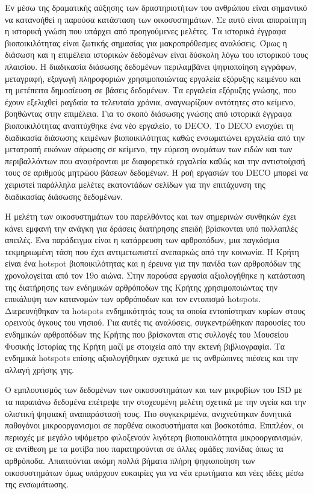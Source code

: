\documentclass[11pt]{article}
\begin{document}
Εν μέσω της δραματικής αύξησης των δραστηριοτήτων του ανθρώπου είναι σημαντικό
να κατανοήθεί η παρούσα κατάσταση των οικοσυστημάτων. Σε αυτό είναι
απαραίτητη η ιστορική γνώση που υπάρχει από προηγούμενες μελέτες.
Τα ιστορικά έγγραφα βιοποικιλότητας είναι ζωτικής σημασίας για
μακροπρόθεσμες αναλύσεις. Όμως η διάσωση και η επιμέλεια ιστορικών δεδομένων είναι δύσκολη λόγω του ιστορικού τους
πλαισίου. Η διαδικασία διάσωσης δεδομένων περιλαμβάνει ψηφιοποίηση εγγράφων, μεταγραφή, εξαγωγή πληροφοριών
χρησιμοποιώντας εργαλεία εξόρυξης κειμένου και τη μετέπειτα δημοσίευση σε βάσεις δεδομένων.
Τα εργαλεία εξόρυξης γνώσης, που έχουν εξελιχθεί ραγδαία τα τελευταία χρόνια,
αναγνωρίζουν οντότητες στο κείμενο, βοηθώντας στην επιμέλεια.
Για το σκοπό διάσωσης γνώσης από ιστορικά έγγραφα βιοποικιλότητας
αναπτύχθηκε ένα νέο εργαλείο, το \textlatin{DECO}. 
Το \textlatin{DECO} ενισχύει τη διαδικασία διάσωσης κειμένων βιοποικιλότητας
καθώς ενσωματώνει εργαλεία από την μετατροπή εικόνων σάρωσης σε κείμενο, την 
εύρεση ονομάτων των ειδών και των περιβαλλόντων που αναφέρονται με διαφορετικά εργαλεία καθώς 
και την αντιστοίχισή τους σε αριθμούς μητρώου βάσεων δεδομένων. 
Η ροή εργασιών του \textlatin{DECO} μπορεί να χειριστεί παράλληλα μελέτες
εκατοντάδων σελίδων για την επιτάχυνση της διαδικασίας διάσωσης δεδομένων.

Η μελέτη των οικοσυστημάτων του παρελθόντος και των σημερινών συνθηκών έχει κάνει εμφανή την ανάγκη για
δράσεις διατήρησης επειδή βρίσκονται υπό πολλαπλές απειλές.
Ένα παράδειγμα είναι η κατάρρευση των αρθροπόδων, μια παγκόσμια τεκμηριωμένη
τάση που έχει αντιμετωπιστεί ανεπαρκώς από την κοινωνία.
Η Κρήτη είναι ένα \textlatin{hotspot} βιοποικιλότητας και η έρευνα για την πανίδα των αρθροπόδων της χρονολογείται από τον 19ο αιώνα.
Στην παρούσα εργασία αξιολογήθηκε η κατάσταση της διατήρησης των ενδημικών αρθρόποδων της Κρήτης χρησιμοποιώντας
την επικάλυψη των κατανομών των αρθρόποδων και τον εντοπισμό \textlatin{hotspots}.
Διερευνήθηκαν τα \textlatin{hotspots} ενδημικότητάς τους τα οποία εντοπίστηκαν κυρίων
στους ορεινούς όγκους του νησιού.
Για αυτές τις αναλύσεις, συγκεντρώθηκαν παρουσίες του ενδημικών αρθροπόδων της Κρήτης
που βρίσκονται στις συλλογές του Μουσείου Φυσικής Ιστορίας της
Κρήτη μαζί με στοιχεία από την εκτενή βιβλιογραφία.
Τα ενδημικά \textlatin{hotspots} επίσης αξιολογήθηκαν σχετικά με τις ανθρώπινες 
πιέσεις και την αλλαγή χρήσης γης.

Ο εμπλουτισμός των δεδομένων των οικοσυστημάτων και των μικροβίων του \textlatin{ISD}
με τα παραπάνω δεδομένα επέτρεψε την στοχευμένη μελέτη σχετικά με την υγεία και
την ολιστική ψηφιακή αναπαράστασή τους. 
Πιο συγκεκριμένα, ανιχνεύτηκαν δυνητικά παθογόνοι μικροοργανισμοι σε
παρθένα οικοσυστήματα και βοσκοτόπια.
Επιπλέον, οι περιοχές με μεγάλο υψόμετρο φιλοξενούν λιγότερη βιοποικιλότητα
μικροοργανισμών, σε αντίθεση με τα μοτίβα που παρατηρούνται σε άλλες ομάδες πανίδας όπως τα αρθρόποδα.
Απαιτούνται ακόμη πολλά βήματα πλήρη ψηφιοποίηση των οικοσυστημάτων
όμως υπάρχουν ευκαιρίες για να νέα ερωτήματα και νέες ιδέες
μέσω της ενσωμάτωσης.
\end{document}
